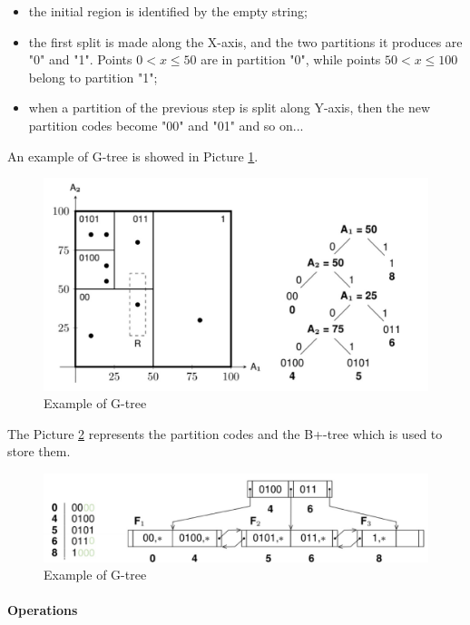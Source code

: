 \begin{itemize}
    \item the initial region is identified by the empty string;
    \item the first split is made along the X-axis, and the two partitions it produces are "0" and "1". Points $0 < x \leq 50$ are in partition "0", while points $50 < x \leq 100$ belong to partition "1";
    \item when a partition of the previous step is split along Y-axis, then the new partition codes become "00" and "01" and so on...
\end{itemize}

An example of G-tree is showed in Picture \ref{part5}.

\begin{figure}[H]
		\centering
		\includegraphics[scale = 0.7]{img/part5.jpg}
        \caption{Example of G-tree}
		\label{part5}
\end{figure}

The Picture \ref{part6} represents the partition codes and the B+-tree which is used to store them.

\begin{figure}[H]
		\centering
		\includegraphics[scale = 0.7]{img/part6.jpg}
        \caption{Example of G-tree}
		\label{part6}
\end{figure}

\paragraph{Operations}

